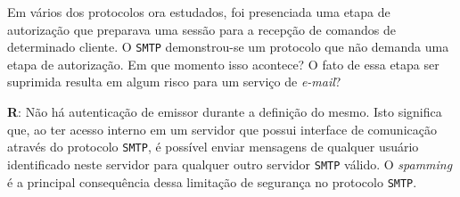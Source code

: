 Em vários dos protocolos ora estudados, foi presenciada uma etapa de autorização que preparava uma sessão para a recepção de comandos de determinado cliente. O \texttt{SMTP} demonstrou-se um protocolo que não demanda uma etapa de autorização. Em que momento isso acontece? O fato de essa etapa ser suprimida resulta em algum risco para um serviço de \emph{e-mail}?

\textbf{R}: Não há autenticação de emissor durante a definição do mesmo. Isto significa que, ao ter acesso interno em um servidor que possui interface de comunicação através do protocolo \texttt{SMTP}, é possível enviar mensagens de qualquer usuário identificado neste servidor para qualquer outro servidor \texttt{SMTP} válido. O \emph{spamming} é a principal consequência dessa limitação de segurança no protocolo \texttt{SMTP}.
